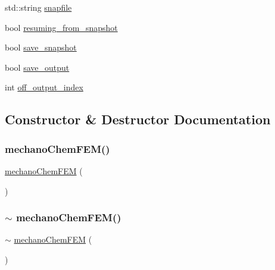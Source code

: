 \begin{DoxyCompactItemize}
std\+::string \mbox{\hyperlink{classmechano_chem_f_e_m_a3ce0cf43eef10e4757e8a225e9b98e96}{snapfile}}
\item 
bool \mbox{\hyperlink{classmechano_chem_f_e_m_a34ea26077a33f792a9468a4d0ac2feaf}{resuming\+\_\+from\+\_\+snapshot}}
\item 
bool \mbox{\hyperlink{classmechano_chem_f_e_m_ade455df689de2bc3fb79e1f468fd5404}{save\+\_\+snapshot}}
\item 
bool \mbox{\hyperlink{classmechano_chem_f_e_m_a883c18cdb18f3c36a226a7cf83e6bae0}{save\+\_\+output}}
\item 
int \mbox{\hyperlink{classmechano_chem_f_e_m_a5b4ed019aaae8f2992f9418a93cd1dbb}{off\+\_\+output\+\_\+index}}
\end{DoxyCompactItemize}


\subsection{Constructor \& Destructor Documentation}
\mbox{\label{classmechano_chem_f_e_m_ae86e36350c9dd3aef65944d2e926311a}} 
\subsubsection{\texorpdfstring{mechanoChemFEM()}{mechanoChemFEM()}}
{\footnotesize\ttfamily \mbox{\hyperlink{classmechano_chem_f_e_m}{mechano\+Chem\+F\+EM}} (\begin{DoxyParamCaption}{ }\end{DoxyParamCaption})}

\mbox{\label{classmechano_chem_f_e_m_a6ac6ffa723cf5e22f90dc80fa5e77ff6}} 
\subsubsection{\texorpdfstring{$\sim$ mechanoChemFEM()}{~ mechanoChemFEM()}}
{\footnotesize\ttfamily $\sim$ \mbox{\hyperlink{classmechano_chem_f_e_m}{mechano\+Chem\+F\+EM}} (\begin{DoxyParamCaption}{ }\end{DoxyParamCaption})}



